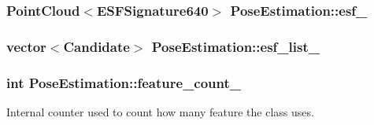 \hypertarget{classPoseEstimation_ae5c93405275434048b7f81e64f1681d1}{
\subsubsection[{esf\-\_\-}]{\setlength{\rightskip}{0pt plus 5cm}Point\-Cloud$<$E\-S\-F\-Signature640$>$ Pose\-Estimation\-::esf\-\_\-\hspace{0.3cm}{\ttfamily [private]}}}\label{classPoseEstimation_ae5c93405275434048b7f81e64f1681d1}
\hypertarget{classPoseEstimation_a9c3ae4cf6ca9e28a2f715c4cf2974610}{
\subsubsection[{esf\-\_\-list\-\_\-}]{\setlength{\rightskip}{0pt plus 5cm}vector$<${\bf Candidate}$>$ Pose\-Estimation\-::esf\-\_\-list\-\_\-\hspace{0.3cm}{\ttfamily [private]}}}\label{classPoseEstimation_a9c3ae4cf6ca9e28a2f715c4cf2974610}
\hypertarget{classPoseEstimation_ade24adda1bd26f6bdf79b54088069d5d}{
\subsubsection[{feature\-\_\-count\-\_\-}]{\setlength{\rightskip}{0pt plus 5cm}int Pose\-Estimation\-::feature\-\_\-count\-\_\-\hspace{0.3cm}{\ttfamily [private]}}}\label{classPoseEstimation_ade24adda1bd26f6bdf79b54088069d5d}


Internal counter used to count how many feature the class uses. 

